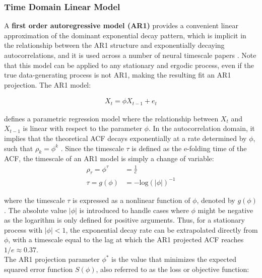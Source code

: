 \documentclass[main.tex]{subfiles}
\begin{document}
\subsubsection{Time Domain Linear Model}\label{sec:time-domain-linear-model}
A \textbf{first order autoregressive model (AR1)} provides a convenient linear approximation of the dominant exponential decay pattern, which is implicit in the relationship between the AR1 structure and exponentially decaying autocorrelations, and it is used across a number of neural timescale papers \citep{kaneoke_variance_2012, meisel_decline_2017, huang_timescales_2018, lurie_cortical_2024, shinn_functional_2023, shafiei_topographic_2020}. Note that this model can be applied to any stationary and ergodic process, even if the true data-generating process is not AR1, making the resulting fit an AR1 projection. The AR1 model:

\begin{align}\label{eq:ar1}
    X_t = \phi X_{t-1} + e_t
\end{align}

\noindent defines a parametric regression model where the relationship between $X_t$ and $X_{t-1}$ is linear with respect to the parameter $\phi$. In the autocorrelation domain, it implies that the theoretical ACF decays exponentially at a rate determined by $\phi$, such that $\rho_k = \phi^k$ \citep[chapter~14.22]{hansen_econometrics_2022}. Since the timescale $\tau$ is defined as the e-folding time of the ACF, the timescale of an AR1 model is simply a change of variable:
\begin{align}
    \rho_\tau = \phi^\tau &= \frac{1}{e}\\
    \tau = g(\phi) &= -{\text{log}(|\phi|)}^{-1} \label{eq:phi-to-tau}
\end{align}

\noindent where the timescale $\tau$ is expressed as a nonlinear function of $\phi$, denoted by $g(\phi)$. The absolute value $|\phi|$ is introduced to handle cases where $\phi$ might be negative as the logarithm is only defined for positive arguments. Thus, for a stationary process with $|\phi|<1$, the exponential decay rate can be extrapolated directly from $\phi$, with a timescale equal to the lag at which the AR1 projected ACF reaches $1/e \approx 0.37$. \\

The AR1 projection parameter $\phi^*$ is the value that minimizes the expected squared error function $S(\phi)$, also referred to as the loss or objective function:
\end{document}
